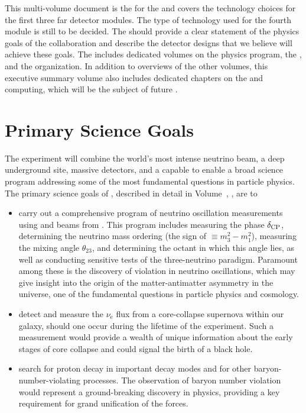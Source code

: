 This multi-volume document is the  for the   and covers the technology choices for the first three far detector modules. The type of  
technology used for the fourth module is still to be decided. The  should provide a clear statement of the physics goals of the  collaboration and describe the detector designs that we believe will achieve these goals. The  includes dedicated volumes on the  physics program, the  , and the   organization. In addition to overviews of the other volumes, this executive summary volume also includes dedicated chapters on the  and computing, which will be the subject of future .

\section{Primary Science Goals}


The  experiment will combine the world's most intense neutrino beam, a deep underground site, massive  detectors, and a capable  to enable a broad science program addressing some of the most fundamental questions in particle physics. 
The primary science goals of , described in detail in Volume~\volnumberphysics{}, \voltitlephysics{}, are to 
\begin{itemize}

\item carry out a comprehensive program of neutrino oscillation measurements using \numu and \anumu beams from . This program includes measuring the   phase $\delta_{\rm CP}$, determining the neutrino mass ordering (the sign of $ \equiv m_3^2-m_1^2$), measuring the mixing angle $\theta_{23}$, and  determining the octant in which this angle lies,
as well as conducting sensitive tests of the three-neutrino paradigm. Paramount among these is the discovery of  violation in neutrino oscillations, which may give insight into the origin of the matter-antimatter asymmetry in the universe, one of the fundamental questions in particle physics and cosmology. 

\item detect and measure the $\nu_\text{e}$ flux from a core-collapse supernova within our galaxy, should one occur during the lifetime of the  experiment. Such a measurement would provide a wealth of unique information about the early stages of core collapse and could signal the birth of a black hole.
    
\item search for proton decay in important decay modes and for other baryon-number-violating processes. The observation of baryon number violation would represent a ground-breaking discovery in physics, providing a key requirement for grand unification of the forces. 

\end{itemize}

